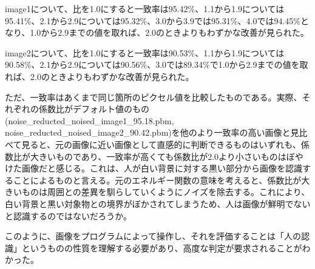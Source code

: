 \documentclass[11pt, oneside]{jsarticle}   	%
\begin{document}
    image1について、比を1.0にすると一致率は95.42\%、1.1から1.9については95.41\%、2.1から2.9については95.32\%、3.0から3.9では95.31\%、4.0では94.45\%となり、1.0から2.9までの値を取れば、2.0のときよりもわずかな改善が見られた。

    image2について、比を1.0にすると一致率は90.53\%、1.1から1.9については90.58\%、2.1から2.9については90.56\%、3.0では89.34\%で1.0から2.9までの値を取れば、2.0のときよりもわずかな改善が見られた。

    ただ、一致率はあくまで同じ箇所のピクセル値を比較したものである。実際、それぞれの係数比がデフォルト値のもの(noise\_reducted\_noised\_image1\_95.18.pbm, noise\_reducted\_noised\_image2\_90.42.pbm)を他のより一致率の高い画像と見比べて見ると、元の画像に近い画像として直感的に判断できるものはいずれも、係数比が大きいものであり、一致率が高くても係数比が2.0より小さいものはぼやけた画像だと感じる。これは、人が白い背景に対する黒い部分から画像を認識することによるものと言える。元のエネルギー関数の意味を考えると、係数比が大きいものは周囲との差異を馴らしていくようにノイズを除去する。これにより、白い背景と黒い対象物との境界がぼかされてしまうため、人は画像が鮮明でないと認識するのではないだろうか。

    このように、画像をプログラムによって操作し、それを評価することは「人の認識」というものの性質を理解する必要があり、高度な判定が要求されることがわかった。
\end{document}
